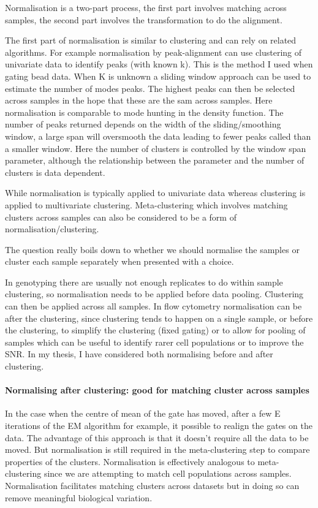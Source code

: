 Normalisation is a two-part process, the first part involves matching across samples, the second part involves the transformation to do the alignment.

The first part of normalisation is similar to clustering and can rely on related algorithms.
For example normalisation by peak-alignment can use clustering of univariate data to identify peaks (with known k).
This is the method I used when gating bead data.
When K is unknown a sliding window approach can be used to estimate the number of modes peaks.
The highest peaks can then be selected across samples in the hope that these are the sam across samples.
Here normalisation is comparable to mode hunting in the density function.
The number of peaks returned depends on the width of the sliding/smoothing window, a large span will oversmooth the data  leading to fewer peaks called than a smaller window.
Here the number of clusters is controlled by the window span parameter, although the relationship between the parameter and the number of clusters is data dependent.

While normalisation is typically applied to univariate data whereas clustering is applied to multivariate clustering.  Meta-clustering which involves matching clusters across samples can also be considered to be a form of normalisation/clustering.

The question really boils down to whether we should normalise the samples or cluster each sample separately when presented with a choice.

In genotyping there are usually not enough replicates to do within sample clustering, so normalisation needs to be applied before data pooling.
Clustering can then be applied across all samples.
In flow cytometry normalisation can be after the clustering, since clustering tends to happen on a single sample, or before the clustering, to simplify the clustering (fixed gating) or to allow for pooling of samples which can be useful to identify rarer cell populations or to improve the SNR.
In my thesis, I have considered both normalising before and after clustering.

\paragraph{Normalising after clustering: good for matching cluster across samples}

In the case when the centre of mean of the gate has moved, after a few E iterations of the EM algorithm for example, it possible to realign the gates on the data.
The advantage of this approach is that it doesn’t require all the data to be moved.
But normalisation is still required in the meta-clustering step to compare properties of the clusters.
Normalisation is effectively analogous to meta-clustering since we are attempting to match cell populations across samples.  
Normalisation facilitates matching clusters across datasets but in doing so can remove meaningful biological variation.  

